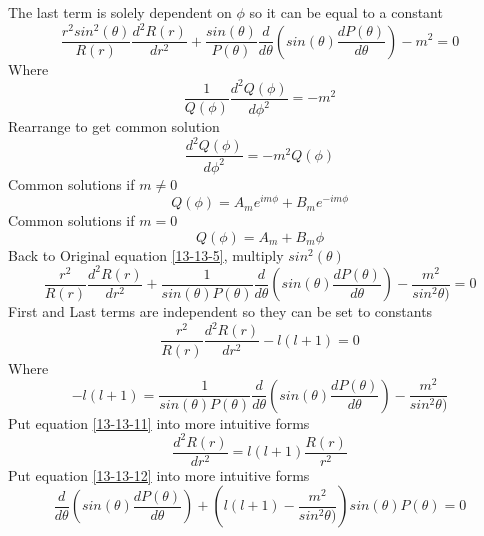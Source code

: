 \documentclass[12pt]{article}
\begin{document}
    The last term is solely dependent on $\phi$ so it can be equal to a constant
    \begin{equation} \label{13-13-5}
        \frac{r^2 sin^2(\theta)}{R(r)} \frac{d^2 R(r)}{dr^2} + \frac{sin(\theta)}{P(\theta)} \frac{d}{d\theta}(sin(\theta) \frac{dP(\theta)}{d\theta}) - m^2 = 0
    \end{equation}
    Where 
    \begin{equation} \label{13-13-6}
        \frac{1}{Q(\phi)} \frac{d^2Q(\phi)}{d\phi^2} = -m^2
    \end{equation}
    Rearrange to get common solution
    \begin{equation} \label{13-13-7}
        \frac{d^2Q(\phi)}{d\phi^2} = -m^2 Q(\phi)
    \end{equation}
    Common solutions if $m\neq0$
    \begin{equation} \label{13-13-8}
        Q(\phi) = A_m e^{im\phi} + B_m e^{-im\phi}
    \end{equation}
    Common solutions if $m=0$
    \begin{equation} \label{13-13-9}
        Q(\phi) = A_m + B_m \phi
    \end{equation}
    Back to Original equation \ref{13-13-5}, multiply $sin^2(\theta)$ 
    \begin{equation} \label{13-13-10}
        \frac{r^2}{R(r)} \frac{d^2 R(r)}{dr^2} + \frac{1}{sin(\theta) P(\theta)} \frac{d}{d\theta}(sin(\theta) \frac{dP(\theta)}{d\theta}) - \frac{m^2}{sin^2\theta)} = 0
    \end{equation}
    First and Last terms are independent so they can be set to constants
    \begin{equation} \label{13-13-11}
        \frac{r^2}{R(r)} \frac{d^2 R(r)}{dr^2} - l (l+1) = 0
    \end{equation}
    Where 
    \begin{equation} \label{13-13-12}
        -l(l+1) = \frac{1}{sin(\theta) P(\theta)} \frac{d}{d\theta}(sin(\theta) \frac{dP(\theta)}{d\theta}) - \frac{m^2}{sin^2\theta)}
    \end{equation}
    Put equation \ref{13-13-11} into more intuitive forms
    \begin{equation} \label{13-13-13}
        \frac{d^2 R(r)}{dr^2} = l(l+1) \frac{R(r)}{r^2} 
    \end{equation}
    Put equation \ref{13-13-12} into more intuitive forms
    \begin{equation} \label{13-13-14}
        \frac{d}{d\theta} (sin(\theta) \frac{d P(\theta)}{d\theta}) + (l(l+1)-\frac{m^2}{sin^2\theta)}) sin(\theta) P(\theta) = 0
    \end{equation}
\end{document}

